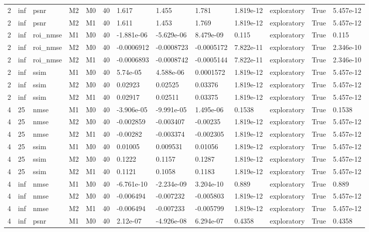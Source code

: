 \begin{tabular}{lllllllllllll}
2 & inf & psnr & M2 & M0 & 40 & 1.617 & 1.455 & 1.781 & 1.819e-12 & exploratory & True & 5.457e-12 \\
2 & inf & psnr & M2 & M1 & 40 & 1.611 & 1.453 & 1.769 & 1.819e-12 & exploratory & True & 5.457e-12 \\
2 & inf & roi\_nmse & M1 & M0 & 40 & -1.881e-06 & -5.629e-06 & 8.479e-09 & 0.115 & exploratory & True & 0.115 \\
2 & inf & roi\_nmse & M2 & M0 & 40 & -0.0006912 & -0.0008723 & -0.0005172 & 7.822e-11 & exploratory & True & 2.346e-10 \\
2 & inf & roi\_nmse & M2 & M1 & 40 & -0.0006893 & -0.0008742 & -0.0005144 & 7.822e-11 & exploratory & True & 2.346e-10 \\
2 & inf & ssim & M1 & M0 & 40 & 5.74e-05 & 4.588e-06 & 0.0001572 & 1.819e-12 & exploratory & True & 5.457e-12 \\
2 & inf & ssim & M2 & M0 & 40 & 0.02923 & 0.02525 & 0.03376 & 1.819e-12 & exploratory & True & 5.457e-12 \\
2 & inf & ssim & M2 & M1 & 40 & 0.02917 & 0.02511 & 0.03375 & 1.819e-12 & exploratory & True & 5.457e-12 \\
4 & 25 & nmse & M1 & M0 & 40 & -3.906e-05 & -9.991e-05 & 1.495e-06 & 0.1538 & exploratory & True & 0.1538 \\
4 & 25 & nmse & M2 & M0 & 40 & -0.002859 & -0.003407 & -0.00235 & 1.819e-12 & exploratory & True & 5.457e-12 \\
4 & 25 & nmse & M2 & M1 & 40 & -0.00282 & -0.003374 & -0.002305 & 1.819e-12 & exploratory & True & 5.457e-12 \\
4 & 25 & ssim & M1 & M0 & 40 & 0.01005 & 0.009531 & 0.01056 & 1.819e-12 & exploratory & True & 5.457e-12 \\
4 & 25 & ssim & M2 & M0 & 40 & 0.1222 & 0.1157 & 0.1287 & 1.819e-12 & exploratory & True & 5.457e-12 \\
4 & 25 & ssim & M2 & M1 & 40 & 0.1121 & 0.1058 & 0.1183 & 1.819e-12 & exploratory & True & 5.457e-12 \\
4 & inf & nmse & M1 & M0 & 40 & -6.761e-10 & -2.234e-09 & 3.204e-10 & 0.889 & exploratory & True & 0.889 \\
4 & inf & nmse & M2 & M0 & 40 & -0.006494 & -0.007232 & -0.005803 & 1.819e-12 & exploratory & True & 5.457e-12 \\
4 & inf & nmse & M2 & M1 & 40 & -0.006494 & -0.007233 & -0.005799 & 1.819e-12 & exploratory & True & 5.457e-12 \\
4 & inf & psnr & M1 & M0 & 40 & 2.12e-07 & -4.926e-08 & 6.294e-07 & 0.4358 & exploratory & True & 0.4358 \\

\end{tabular}

